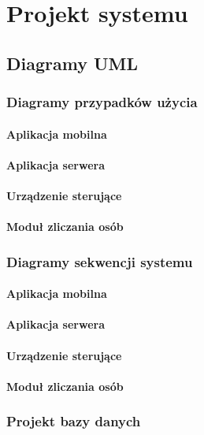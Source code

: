 % 
\newpage\section{Projekt systemu \NazwaSys}\label{sec:projekt}
\subsection{Diagramy UML}

	\subsubsection{Diagramy przypadków użycia}
	
		\paragraph{Aplikacja mobilna}
		\paragraph{Aplikacja serwera}
		\paragraph{Urządzenie sterujące}
		\paragraph{Moduł zliczania osób}
		
	\subsubsection{Diagramy sekwencji systemu}
	
		\paragraph{Aplikacja mobilna}
		\paragraph{Aplikacja serwera}
		\paragraph{Urządzenie sterujące}
		\paragraph{Moduł zliczania osób}
		
	\subsubsection{Projekt bazy danych} 
	
